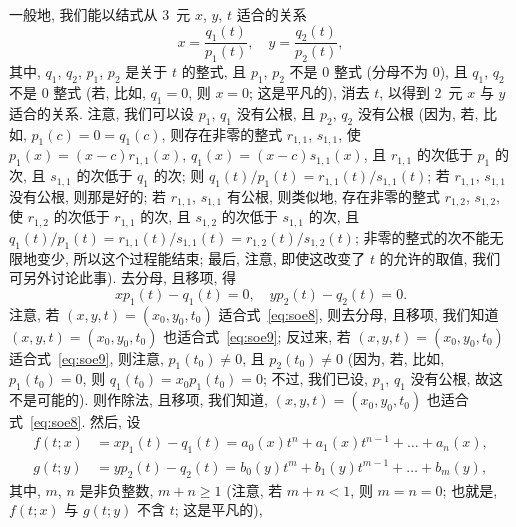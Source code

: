 \documentclass[../libro.tex]{subfiles}
\begin{document}
一般地, 我们能以结式从 \(3\)~元 \(x\), \(y\), \(t\)
适合的关系
\begin{equation}
    x = \frac{q_1 (t)}{p_1 (t)},
    \quad
    y = \frac{q_2 (t)}{p_2 (t)},
    \label{eq:soe8}
\end{equation}
其中, \(q_1\), \(q_2\), \(p_1\), \(p_2\)
是关于 \(t\) 的整式,
且 \(p_1\), \(p_2\) 不是 \(0\) 整式 (分母不为 \(0\)),
且 \(q_1\), \(q_2\) 不是 \(0\) 整式
(若, 比如, \(q_1 = 0\), 则 \(x = 0\);
这是平凡的),
消去 \(t\), 以得到
\(2\)~元 \(x\) 与 \(y\) 适合的关系.
注意, 我们可以设 \(p_1\), \(q_1\) 没有公根,
且 \(p_2\), \(q_2\) 没有公根
(因为, 若, 比如, %
\(p_1 (c) = 0 = q_1 (c)\),
则存在非零的整式 \(r_{1,1}\), \(s_{1,1}\),
使 \(p_1 (x) = (x - c) r_{1,1} (x)\),
\(q_1 (x) = (x - c) s_{1,1} (x)\),
且 \(r_{1,1}\) 的次低于 \(p_1\) 的次,
且 \(s_{1,1}\) 的次低于 \(q_1\) 的次;
则 \(q_1 (t) / p_1 (t) = r_{1,1} (t) / s_{1,1} (t)\);
若 \(r_{1,1}\), \(s_{1,1}\) 没有公根, 则那是好的;
若 \(r_{1,1}\), \(s_{1,1}\) 有公根,
则类似地, 存在非零的整式 \(r_{1,2}\), \(s_{1,2}\),
使 \(r_{1,2}\) 的次低于 \(r_{1,1}\) 的次,
且 \(s_{1,2}\) 的次低于 \(s_{1,1}\) 的次,
且 \(q_1 (t) / p_1 (t)
    = r_{1,1} (t) / s_{1,1} (t)
= r_{1,2} (t) / s_{1,2} (t)\);
非零的整式的次不能无限地变少,
所以这个过程能结束;
最后, 注意, 即使这改变了 \(t\) 的允许的取值,
我们可另外讨论此事). %
去分母, 且移项, 得
\begin{equation}
    x p_1 (t) - q_1 (t) = 0,
    \quad
    y p_2 (t) - q_2 (t) = 0.
    \label{eq:soe9}
\end{equation}
注意, 若 \((x, y, t) = (x_0, y_0, t_0)\)
适合式~\eqref{eq:soe8},
则去分母, 且移项, 我们知道
\((x, y, t) = (x_0, y_0, t_0)\)
也适合式~\eqref{eq:soe9};
反过来, 若 \((x, y, t) = (x_0, y_0, t_0)\)
适合式~\eqref{eq:soe9},
则注意, \(p_1 (t_0) \neq 0\), 且 \(p_2 (t_0) \neq 0\)
(因为, 若, 比如, \(p_1 (t_0) = 0\), %
则 \(q_1 (t_0) = x_0 p_1 (t_0) = 0\);
不过, 我们已设, \(p_1\), \(q_1\) 没有公根,
故这不是可能的). %
则作除法, 且移项, 我们知道,
\((x, y, t) = (x_0, y_0, t_0)\)
也适合式~\eqref{eq:soe8}.
然后, 设
\begin{align*}
    f(t; x) & = x p_1 (t) - q_1 (t)
    = a_0 (x) t^n + a_1 (x) t^{n-1} + \dots + a_n (x),
    \\
    g(t; y) & = y p_2 (t) - q_2 (t)
    = b_0 (y) t^m + b_1 (y) t^{m-1} + \dots + b_m (y),
\end{align*}
其中, \(m\), \(n\) 是非负整数,
\(m + n \geq 1\)
(注意, 若 \(m + n < 1\), %
则 \(m = n = 0\);
也就是, \(f(t; x)\) 与 \(g(t; y)\) 不含 \(t\);
这是平凡的), %
\end{document}
